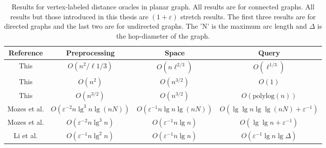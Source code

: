 \begin{table}[h!]
  \centering
  \begin{adjustbox}{width=1\textwidth}
  \small
  \begin{tabular}{c | c | c | c}
    Reference & Preprocessing & Space & Query \\
    \hline\hline
    This & $O(n^2/\ell{1/3})$ & $O(n\ell^{2/3})$ & $O(\ell^{1/3})$ \\
    \hline
    This & $O(n^2)$ & $O(n^{3/2})$ & $O(1)$ \\
    \hline
    This & $O(n^{3/2})$ & $O(n^{3/2})$ & $O(\text{polylog}(n))$ \\
    \hline
    Mozes et al. \cite{mozes2015efficient} &
    $O(\varepsilon^{-2}n\lg^3 n\lg (nN))$ & $O(\varepsilon^{-1}n\lg n \lg(nN))$ & $O(\lg
    \lg n \lg \lg (nN) + \varepsilon^{-1})$ \\
    \hline
    Mozes et al. \cite{mozes2015efficient} & $O(\varepsilon^{-2}n\lg^3 n)$ & $O(\varepsilon^{-1}n\lg n)$ &
    $O(\lg \lg n + \varepsilon^{-1})$ \\
    \hline
    Li et al. \cite{li20131+} & $O(\varepsilon^{-1}n\lg^2 n)$ & $O(\varepsilon^{-1}n\lg n)$ & $O(\varepsilon^{-1}\lg
    n \lg \Delta)$
  \end{tabular}
\end{adjustbox}
  \caption{Results for vertex-labeled distance oracles in planar graph. All results are
  for connected graphs. All results but those introduced in this thesis are
$(1+\varepsilon)$ stretch results. The first three results are for directed graphs and
the last two are for undirected graphs. The 'N' is the maximum arc length and $\Delta$ is the hop-diameter
of the graph.}
  \label{vertexresults}
\end{table}

